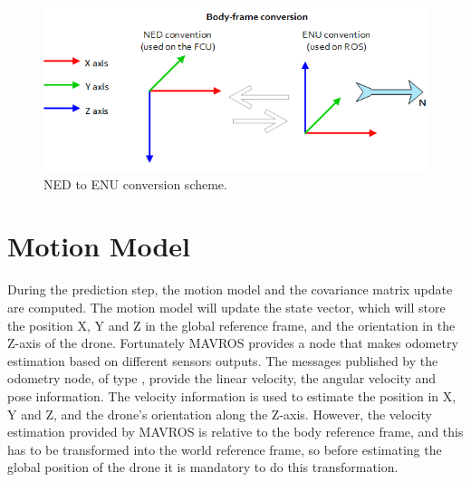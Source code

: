 \begin{figure}
    \centering
    \includegraphics[width=\textwidth]{Images/fig6-ned2enu.png}
    \caption[NED to ENU conversion scheme]{NED to ENU conversion scheme. \cite{mavros}}
    \label{fig:chapter2:drone:frames:enu2ned}
\end{figure}

\section{Motion Model}
\label{sec:chapter2:prediction}
During the prediction step, the motion model and the covariance matrix update are computed. The motion model will update the state vector, which will store the position X, Y and Z in the global reference frame, and the orientation in the Z-axis of the drone. Fortunately MAVROS provides a node that makes odometry estimation based on different sensors outputs. The messages published by the odometry node, of type , provide the linear velocity, the angular velocity and pose information. The velocity information is used to estimate the position in X, Y and Z, and the drone's orientation along the Z-axis. However, the velocity estimation provided by MAVROS is relative to the body reference frame, and this has to be transformed into the world reference frame, so before estimating the global position of the drone it is mandatory to do this transformation.

